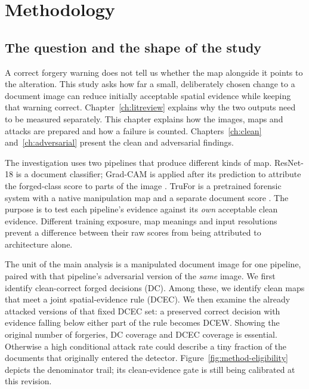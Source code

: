 
\chapter{Methodology}
\label{ch:methodology}

\section{The question and the shape of the study}
\label{sec:method-question}

A correct forgery warning does not tell us whether the map alongside it points to the alteration. This study asks how far a small, deliberately chosen change to a document image can reduce initially acceptable spatial evidence while keeping that warning correct. Chapter~\ref{ch:litreview} explains why the two outputs need to be measured separately. This chapter explains how the images, maps and attacks are prepared and how a failure is counted. Chapters~\ref{ch:clean} and~\ref{ch:adversarial} present the clean and adversarial findings.

The investigation uses two pipelines that produce different kinds of map. ResNet-18 is a document classifier; Grad-CAM is applied after its prediction to attribute the forged-class score to parts of the image \citep{he2016resnet,selvaraju2017gradcam}. TruFor is a pretrained forensic system with a native manipulation map and a separate document score \citep{guillaro2023trufor}. The purpose is to test each pipeline's evidence against its \emph{own} acceptable clean evidence. Different training exposure, map meanings and input resolutions prevent a difference between their raw scores from being attributed to architecture alone.

The unit of the main analysis is a manipulated document image for one pipeline, paired with that pipeline's adversarial version of the \emph{same} image. We first identify clean-correct forged decisions (DC). Among these, we identify clean maps that meet a joint spatial-evidence rule (DCEC). We then examine the already attacked versions of that fixed DCEC set: a preserved correct decision with evidence falling below either part of the rule becomes DCEW. Showing the original number of forgeries, DC coverage and DCEC coverage is essential. Otherwise a high conditional attack rate could describe a tiny fraction of the documents that originally entered the detector. Figure~\ref{fig:method-eligibility} depicts the denominator trail; its clean-evidence gate is still being calibrated at this revision.

